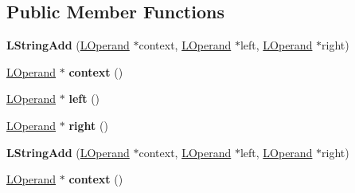 \subsection*{Public Member Functions}
\begin{DoxyCompactItemize}
\item 
{\bfseries L\+String\+Add} (\hyperlink{classv8_1_1internal_1_1_l_operand}{L\+Operand} $\ast$context, \hyperlink{classv8_1_1internal_1_1_l_operand}{L\+Operand} $\ast$left, \hyperlink{classv8_1_1internal_1_1_l_operand}{L\+Operand} $\ast$right)\hypertarget{classv8_1_1internal_1_1_l_string_add_a8c7a0225dcb0347fca518802f8caa913}{}\label{classv8_1_1internal_1_1_l_string_add_a8c7a0225dcb0347fca518802f8caa913}

\item 
\hyperlink{classv8_1_1internal_1_1_l_operand}{L\+Operand} $\ast$ {\bfseries context} ()\hypertarget{classv8_1_1internal_1_1_l_string_add_a607556e17316f1fd938b9e8731005f46}{}\label{classv8_1_1internal_1_1_l_string_add_a607556e17316f1fd938b9e8731005f46}

\item 
\hyperlink{classv8_1_1internal_1_1_l_operand}{L\+Operand} $\ast$ {\bfseries left} ()\hypertarget{classv8_1_1internal_1_1_l_string_add_a67ecfc808a49ae160114f0e53f366037}{}\label{classv8_1_1internal_1_1_l_string_add_a67ecfc808a49ae160114f0e53f366037}

\item 
\hyperlink{classv8_1_1internal_1_1_l_operand}{L\+Operand} $\ast$ {\bfseries right} ()\hypertarget{classv8_1_1internal_1_1_l_string_add_ae0c15e935d032468c5b8e4b12d3dd71f}{}\label{classv8_1_1internal_1_1_l_string_add_ae0c15e935d032468c5b8e4b12d3dd71f}

\item 
{\bfseries L\+String\+Add} (\hyperlink{classv8_1_1internal_1_1_l_operand}{L\+Operand} $\ast$context, \hyperlink{classv8_1_1internal_1_1_l_operand}{L\+Operand} $\ast$left, \hyperlink{classv8_1_1internal_1_1_l_operand}{L\+Operand} $\ast$right)\hypertarget{classv8_1_1internal_1_1_l_string_add_a8c7a0225dcb0347fca518802f8caa913}{}\label{classv8_1_1internal_1_1_l_string_add_a8c7a0225dcb0347fca518802f8caa913}

\item 
\hyperlink{classv8_1_1internal_1_1_l_operand}{L\+Operand} $\ast$ {\bfseries context} ()\hypertarget{classv8_1_1internal_1_1_l_string_add_a607556e17316f1fd938b9e8731005f46}{}\label{classv8_1_1internal_1_1_l_string_add_a607556e17316f1fd938b9e8731005f46}


\end{DoxyCompactItemize}
